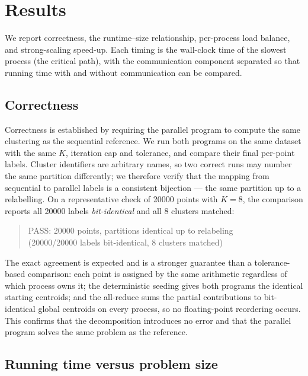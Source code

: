 \documentclass[11pt,a4paper]{article}
\begin{document}
\section{Results}
\label{sec:results}

We report correctness, the runtime--size relationship, per-process load balance,
and strong-scaling speed-up. Each timing is the wall-clock time of the slowest
process (the critical path), with the communication component separated so that
running time with and without communication can be compared.

\subsection{Correctness}
\label{sec:correctness}

Correctness is established by requiring the parallel program to compute the same
clustering as the sequential reference. We run both programs on the same dataset
with the same $K$, iteration cap and tolerance, and compare their final
per-point labels. Cluster identifiers are arbitrary names, so two correct runs
may number the same partition differently; we therefore verify that the mapping
from sequential to parallel labels is a consistent bijection --- the same
partition up to a relabelling. On a representative check of \num{20000} points
with $K=8$, the comparison reports all \num{20000} labels
\emph{bit-identical} and all $8$ clusters matched:
\begin{quote}\small\ttfamily
PASS: 20000 points, partitions identical up to relabeling\\
(20000/20000 labels bit-identical, 8 clusters matched)
\end{quote}
The exact agreement is expected and is a stronger guarantee than a
tolerance-based comparison: each point is assigned by the same arithmetic
regardless of which process owns it; the deterministic seeding gives both
programs the identical starting centroids; and the all-reduce sums the partial
contributions to bit-identical global centroids on every process, so no
floating-point reordering occurs. This confirms that the decomposition
introduces no error and that the parallel program solves the same problem as the
reference.

\subsection{Running time versus problem size}
\label{sec:vsN}
\end{document}
